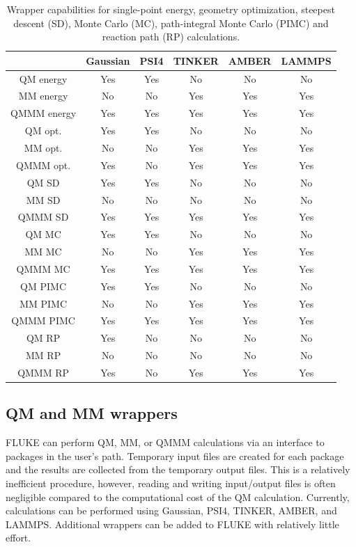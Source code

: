 \documentclass[12pt]{report}
\begin{document}
\begin{table}[hbt]
 \centering
 \begin{tabular}{|c|c c|c c c|}
 \hline
  & Gaussian & PSI4 & TINKER & AMBER & LAMMPS \\ \hline
 QM energy & Yes & Yes & No & No & No \\
 MM energy & No & No & Yes & Yes & Yes \\
 QMMM energy & Yes & Yes & Yes & Yes & Yes \\ \hline
 QM opt. & Yes & Yes & No & No & No \\
 MM opt. & No & No & Yes & Yes & Yes \\
 QMMM opt. & Yes & No & Yes & Yes & Yes \\ \hline
 QM SD & Yes & Yes & No & No & No \\
 MM SD & No & No & No & No & No \\
 QMMM SD & Yes & Yes & Yes & Yes & Yes \\ \hline
 QM MC & Yes & Yes & No & No & No \\
 MM MC & No & No & Yes & Yes & Yes \\
 QMMM MC & Yes & Yes & Yes & Yes & Yes \\ \hline
 QM PIMC & Yes & Yes & No & No & No \\
 MM PIMC & No & No & Yes & Yes & Yes \\
 QMMM PIMC & Yes & Yes & Yes & Yes & Yes \\ \hline
 QM RP & Yes & No & No & No & No \\
 MM RP & No & No & No & No & No \\
 QMMM RP & Yes & No & Yes & Yes & Yes \\ \hline
 \end{tabular}
 \caption{Wrapper capabilities for single-point energy, geometry optimization,
 steepest descent (SD), Monte Carlo (MC), path-integral Monte Carlo (PIMC) and
 reaction path (RP) calculations.}
 \label{tab:WrapCap}
\end{table}

\subsection{QM and MM wrappers}

FLUKE can perform QM, MM, or QMMM calculations via an interface to packages
in the user's path. Temporary input files are created for each package and
the results are collected from the temporary output files. This is a
relatively inefficient procedure, however, reading and writing input/output
files is often negligible compared to the computational cost of the QM
calculation. Currently, calculations can be performed using Gaussian, PSI4,
TINKER, AMBER, and LAMMPS. Additional wrappers can be added to FLUKE with
relatively little effort.
\end{document}
